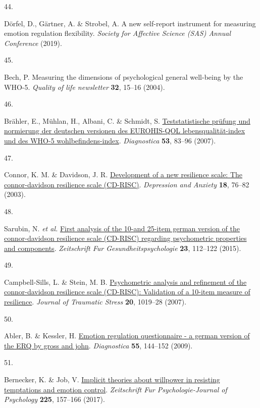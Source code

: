 \documentclass[
  man,floatsintext]{apa6}
\newlength{\cslhangindent}
\newlength{\csllabelwidth}
\newlength{\cslentryspacingunit} %
\newenvironment{CSLReferences}[2] %
 {%
  \setlength{\parindent}{0pt}
  \ifodd #1
  \let\oldpar\par
  \def\par{\hangindent=\cslhangindent\oldpar}
  \fi
  \setlength{\parskip}{#2\cslentryspacingunit}
 }%
 {}
\newcommand{\CSLLeftMargin}[1]{\parbox[t]{\csllabelwidth}{#1}}
\newcommand{\CSLRightInline}[1]{\parbox[t]{\linewidth - \csllabelwidth}{#1}\break}
\begin{document}
\begin{CSLReferences}{0}{0}
\leavevmode{}%
\CSLLeftMargin{44. }%
\CSLRightInline{Dörfel, D., Gärtner, A. \& Strobel, A. A new self-report instrument for measuring emotion regulation flexibility. \emph{Society for Affective Science (SAS) Annual Conference} (2019).}

\leavevmode{}%
\CSLLeftMargin{45. }%
\CSLRightInline{Bech, P. Measuring the dimensions of psychological general well-being by the WHO-5. \emph{Quality of life newsletter} \textbf{32}, 15--16 (2004).}

\leavevmode{}%
\CSLLeftMargin{46. }%
\CSLRightInline{Brähler, E., Mühlan, H., Albani, C. \& Schmidt, S. \href{https://doi.org/10.1026/0012-1924.53.2.83}{Teststatistische pr{ü}fung und normierung der deutschen versionen des EUROHIS-QOL lebensqualit{ä}t-index und des WHO-5 wohlbefindens-index}. \emph{Diagnostica} \textbf{53}, 83--96 (2007).}

\leavevmode{}%
\CSLLeftMargin{47. }%
\CSLRightInline{Connor, K. M. \& Davidson, J. R. \href{https://doi.org/10.1002/da.10113}{Development of a new resilience scale: The connor-davidson resilience scale (CD-RISC)}. \emph{Depression and Anxiety} \textbf{18}, 76--82 (2003).}

\leavevmode{}%
\CSLLeftMargin{48. }%
\CSLRightInline{Sarubin, N. \emph{et al.} \href{https://doi.org/10.1026/0943-8149/a000142}{First analysis of the 10-and 25-item german version of the connor-davidson resilience scale (CD-RISC) regarding psychometric properties and components}. \emph{Zeitschrift Fur Gesundheitspsychologie} \textbf{23}, 112--122 (2015).}

\leavevmode{}%
\CSLLeftMargin{49. }%
\CSLRightInline{Campbell-Sills, L. \& Stein, M. B. \href{https://doi.org/10.1002/jts.20271}{Psychometric analysis and refinement of the connor-davidson resilience scale (CD-RISC): Validation of a 10-item measure of resilience}. \emph{Journal of Traumatic Stress} \textbf{20}, 1019--28 (2007).}

\leavevmode{}%
\CSLLeftMargin{50. }%
\CSLRightInline{Abler, B. \& Kessler, H. \href{https://doi.org/10.1026/0012-1924.55.3.144}{Emotion regulation questionnaire - a german version of the ERQ by gross and john}. \emph{Diagnostica} \textbf{55}, 144--152 (2009).}

\leavevmode{}%
\CSLLeftMargin{51. }%
\CSLRightInline{Bernecker, K. \& Job, V. \href{https://doi.org/10.1027/2151-2604/a000292}{Implicit theories about willpower in resisting temptations and emotion control}. \emph{Zeitschrift Fur Psychologie-Journal of Psychology} \textbf{225}, 157--166 (2017).}


\end{CSLReferences}
\end{document}
